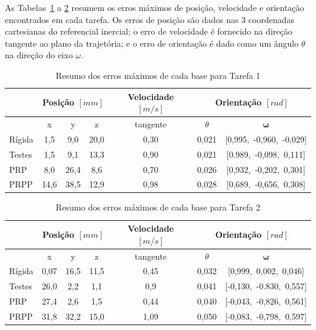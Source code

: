 As Tabelas~\ref{tab::erros_t1} a \ref{tab::erros_t2} resumem os
erros máximos de posição, velocidade e orientação encontrados em cada tarefa. Os
erros de posição são dados nas 3 coordenadas cartesianas do referencial
inercial; o erro de velocidade é fornecido na direção tangente ao plano da
trajetória; e o erro de orientação é dado como um ângulo $\theta$ na direção do eixo $\omega$.

\begin{table}[h!]
\centering
\caption{Resumo dos erros máximos de cada base para Tarefa 1}
\label{tab::erros_t1}
\begin{tabular}{@{}lcccccc@{}}
\toprule
       & \multicolumn{3}{c}{\textbf{Posição $[mm]$}} & \textbf{Velocidade $[m/s]$} & \multicolumn{2}{c}{\textbf{Orientação $[rad]$}} 	\\ \midrule
         & x          & y          & z          & tangente            & $\theta$            & $\boldsymbol{\omega}$    		\\
Rígida & 1,5      	  & 9,0        & 20,0       & 0,30                &	0,021				& [0,995,~-0,960,~-0,029]		\\
Testes & 1,5    	  & 9,1        & 13,3       & 0,90                &	0,021				& [0.989,~-0,098,~0,111]		\\
PRP    & 8,0	 	  &	26,4	   & 8,6		& 0,70				  &	0,026				& [0,932,~-0,202,~0,301]						\\
PRPP   & 14,6  	 	  &	38,5	   & 12,9		& 0,98				  &	0,028				& [0,689,~-0,656,~0,308]		\\ \bottomrule
\end{tabular}
\end{table}


\begin{table}[h!]
\centering
\caption{Resumo dos erros máximos de cada base para Tarefa 2}
\label{tab::erros_t2}
\begin{tabular}{@{}lcccccc@{}}
\toprule
       & \multicolumn{3}{c}{\textbf{Posição $[mm]$}} & \textbf{Velocidade $[m/s]$} & \multicolumn{2}{c}{\textbf{Orientação $[rad]$}} 	\\ \midrule
         & x          & y          & z          & tangente            & $\theta$            & $\boldsymbol{\omega}$    		\\
Rígida & 0,07       & 16,5	   	& 11,5       	& 0,45                & 0,032				& [0,999,~0,002,~0,046] 		\\
Testes & 26,0     	& 2,2 	   	& 1,1			& 0,9                 & 0,041				& [-0,130,~-0.830,~0,557]		\\
PRP    & 27,4		& 2,6		& 1,5			& 0,44				  &	0,040				& [-0,043,~-0,826,~0,561]		\\
PRPP   & 31,8		& 32,2		& 15,0			& 1,09				  &	0,050				& [-0,083,~-0,798,~0,597]						\\ \bottomrule
\end{tabular}
\end{table}




